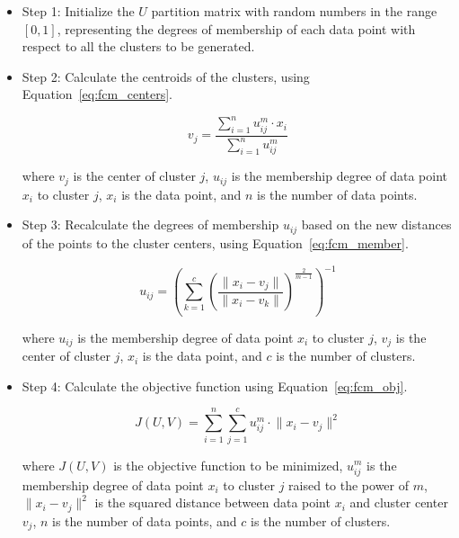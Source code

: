 \documentclass[a4paper,fleqn]{cas-dc}
\begin{document}
\begin{itemize}
    \item Step 1: Initialize the \(U\) partition matrix with random numbers in the range \([0, 1]\), representing the degrees of membership of each data point with respect to all the clusters to be generated.
    
    \item Step 2: Calculate the centroids of the clusters, using Equation~\ref{eq:fcm_centers}.

    \begin{equation} \label{eq:fcm_centers}
        v_j = \frac{\sum_{i=1}^{n} u_{ij}^m \cdot x_i}{\sum_{i=1}^{n} u_{ij}^m}
    \end{equation}

    where \(v_j\) is the center of cluster \(j\), \(u_{ij}\) is the membership degree of data point \(x_i\) to cluster \(j\), \(x_i\) is the data point, and \(n\) is the number of data points.

    \item Step 3: Recalculate the degrees of membership \(u_{ij}\) based on the new distances of the points to the cluster centers, using Equation~\ref{eq:fcm_member}. 

    \begin{equation} \label{eq:fcm_member}
        u_{ij} = \left( \sum_{k=1}^{c} \left( \frac{\lVert x_i - v_j \rVert}{\lVert x_i - v_k \rVert} \right)^{\frac{2}{m-1}} \right)^{-1}
    \end{equation}

    where \(u_{ij}\) is the membership degree of data point \(x_i\) to cluster \(j\), \(v_j\) is the center of cluster \(j\), \(x_i\) is the data point, and \(c\) is the number of clusters.
    
    \item Step 4: Calculate the objective function using Equation~\ref{eq:fcm_obj}.

    \begin{equation} \label{eq:fcm_obj}
        J(U, V) = \sum_{i=1}^{n} \sum_{j=1}^{c} u_{ij}^m \cdot \lVert x_i - v_j \rVert^2
    \end{equation}

    where \(J(U, V)\) is the objective function to be minimized, \(u_{ij}^m\) is the membership degree of data point \(x_i\) to cluster \(j\) raised to the power of \(m\), \(\lVert x_i - v_j \rVert^2\) is the squared distance between data point \(x_i\) and cluster center \(v_j\), \(n\) is the number of data points, and \(c\) is the number of clusters.


\end{itemize}
\end{document}
